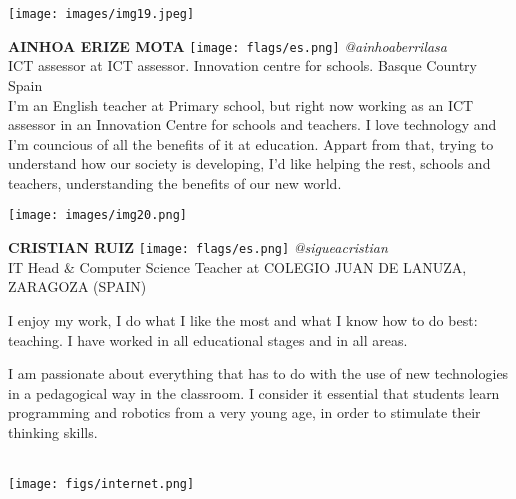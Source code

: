 \noindent
\begin{minipage}{0.3\textwidth}
\centering
\texttt{[image: images/img19.jpeg]}
\end{minipage}
\hfill
\begin{minipage}{0.6\textwidth}\raggedright
\color{color1}\uppercase{\textbf{Ainhoa Erize Mota}}
\color{color2}\hspace{0.2cm}\texttt{[image: flags/es.png]}
\hspace{0.2cm}\textit{@ainhoaberrilasa}
\\
ICT assessor at ICT assessor. Innovation centre for schools. Basque Country Spain\\
{\footnotesize I'm an English teacher at Primary school, but right now working as an ICT assessor in an Innovation Centre for schools and teachers. I love technology and I'm councious of all the benefits of it at education. Appart from that, trying to understand how our society is developing, I'd like helping the rest, schools and teachers, understanding the benefits of our new world. }\\
\end{minipage}
\newline\newline\newline

\noindent
\begin{minipage}{0.3\textwidth}
\centering
\texttt{[image: images/img20.png]}
\end{minipage}
\hfill
\begin{minipage}{0.6\textwidth}\raggedright
\color{color1}\uppercase{\textbf{CRISTIAN RUIZ}}
\color{color2}\hspace{0.2cm}\texttt{[image: flags/es.png]}
\hspace{0.2cm}\textit{@sigueacristian}
\\
IT Head \& Computer Science Teacher at COLEGIO JUAN DE LANUZA, ZARAGOZA (SPAIN)\\
{\footnotesize I enjoy my work, I do what I like the most and what I know how to do best: teaching. I have worked in all educational stages and in all areas.

I am passionate about everything that has to do with the use of new technologies in a pedagogical way in the classroom. I consider it essential that students learn programming and robotics from a very young age, in order to stimulate their thinking skills.}\\
\texttt{[image: figs/internet.png]}
\end{minipage}
\newline\newline\newline

